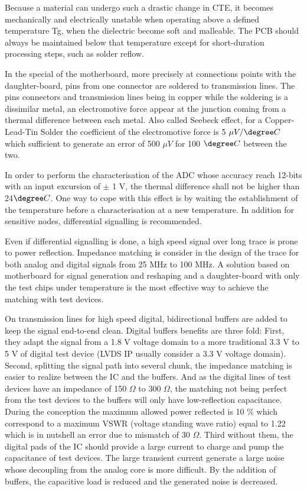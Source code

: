 Because a material can undergo such a drastic change in CTE, it becomes mechanically and electrically unstable when operating above a defined temperature Tg, when the dielectric become soft and malleable. The PCB should always be maintained below that temperature except for short-duration processing steps, such as solder reflow.

In the special of the motherboard, more precisely at connections points with the daughter-board, pins from one connector are soldered to transmission lines. The pins connectors and transmission lines being in copper while the soldering is a dissimilar metal, an electromotive force appear at the junction coming from a thermal difference between each metal. Also called Seebeck effect, for a Copper-Lead-Tin Solder the coefficient of the electromotive force is 5 \(\mu V/\degree C \) which sufficient to generate an error of 500 \(\mu V\) for 100 \(\degree C\) between the two.

In order to perform the characterisation of the ADC whose accuracy reach 12-bits with an input excursion of \(\pm \) 1 V, the thermal difference shall not be higher than 24\(\degree C\). One way to cope with this effect is by waiting the establishment of the temperature before a characterisation at a new temperature. In addition for sensitive nodes, differential signalling is recommended.

Even if differential signalling is done, a high speed signal over long trace is prone to power reflection. Impedance matching is consider in the design of the trace for both analog and digital signals from 25 MHz to 100 MHz. A solution based on motherboard for signal generation and reshaping and a daughter-board with only the test chips under temperature is the most effective way to achieve the matching with test devices.

On transmission lines for high speed digital, bidirectional buffers are added to keep the signal end-to-end clean. Digital buffers benefits are three fold: First, they adapt the signal from a 1.8 V voltage domain to a more traditional 3.3 V to 5 V of digital test device (LVDS IP usually consider a 3.3 V voltage domain). Second, splitting the signal path into several chunk, the impedance matching is easier to realize between the IC and the buffers. And as the digital lines of test devices have an impedance of 150 \(\Omega \) to 300 \(\Omega \), the matching not being perfect from the test devices to the buffers will only have low-reflection capacitance. During the conception the maximum allowed power reflected is 10 \% which correspond to a maximum VSWR (voltage standing wave ratio) equal to 1.22 which is in nutshell an error due to mismatch of 30 \(\Omega \). Third without them, the digital pads of the IC should provide a large current to charge and pump the capacitance of test devices. The large transient current generate a large noise whose decoupling from the analog core is more difficult. By the addition of buffers, the capacitive load is reduced and the generated noise is decreased.

